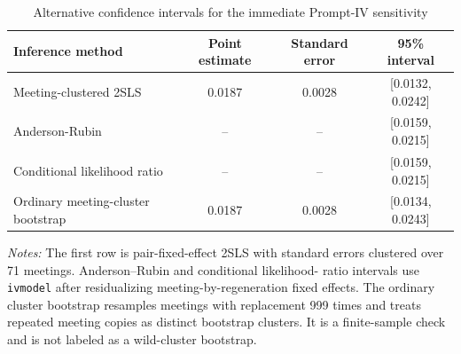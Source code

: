 \begin{table}[htbp]
\color{revisionred}
\centering
\begin{threeparttable}
\caption{Alternative confidence intervals for the immediate Prompt-IV sensitivity}
\label{tab:app-iv-inference}
\begin{footnotesize}
\begin{tabular}{lccc}
\toprule
Inference method & Point estimate & Standard error & 95\% interval \\
\midrule
Meeting-clustered 2SLS & 0.0187 & 0.0028 & [0.0132, 0.0242] \\
Anderson-Rubin & -- & -- & [0.0159, 0.0215] \\
Conditional likelihood ratio & -- & -- & [0.0159, 0.0215] \\
Ordinary meeting-cluster bootstrap & 0.0187 & 0.0028 & [0.0134, 0.0243] \\
\bottomrule
\end{tabular}
\begin{tablenotes}[flushleft]
\scriptsize
\item \textit{Notes:} The first row is pair-fixed-effect 2SLS with standard errors clustered over 71 meetings. Anderson--Rubin and conditional likelihood- ratio intervals use \texttt{ivmodel} after residualizing meeting-by-regeneration fixed effects. The ordinary cluster bootstrap resamples meetings with replacement 999 times and treats repeated meeting copies as distinct bootstrap clusters. It is a finite-sample check and is not labeled as a wild-cluster bootstrap.
\end{tablenotes}
\end{footnotesize}
\end{threeparttable}
\end{table}
